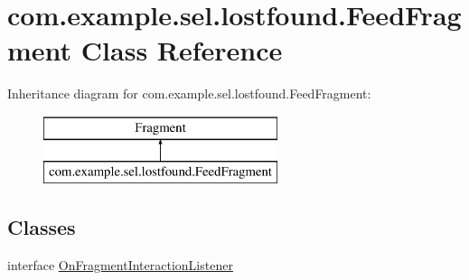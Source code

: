 \hypertarget{classcom_1_1example_1_1sel_1_1lostfound_1_1FeedFragment}{\section{com.\-example.\-sel.\-lostfound.\-Feed\-Fragment Class Reference}
\label{classcom_1_1example_1_1sel_1_1lostfound_1_1FeedFragment}
}
Inheritance diagram for com.\-example.\-sel.\-lostfound.\-Feed\-Fragment\-:\begin{figure}[H]
\begin{center}
\leavevmode
\includegraphics[height=2.000000cm]{classcom_1_1example_1_1sel_1_1lostfound_1_1FeedFragment}
\end{center}
\end{figure}
\subsection*{Classes}
\begin{DoxyCompactItemize}
\item 
interface \hyperlink{interfacecom_1_1example_1_1sel_1_1lostfound_1_1FeedFragment_1_1OnFragmentInteractionListener}{On\-Fragment\-Interaction\-Listener}
\end{DoxyCompactItemize}
